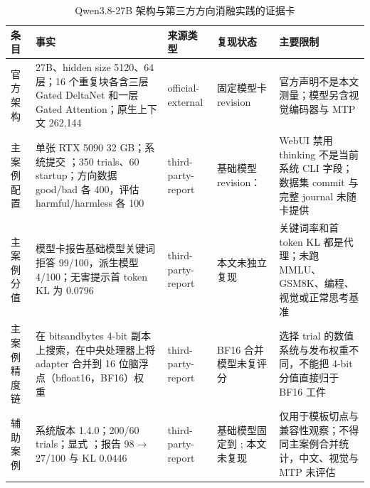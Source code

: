 \begin{table}[t]
  \caption{Qwen3.8-27B 架构与第三方方向消融实践的证据卡}
  \label{tab:qwen-case}
  \centering
  \scriptsize
  \begin{tabularx}{\textwidth}{@{}p{23mm}p{52mm}p{24mm}p{27mm}Y@{}}
    \toprule
    条目 & 事实 & 来源类型 & 复现状态 & 主要限制 \\
    \midrule
    官方架构 & 27B、hidden size 5120、64 层；16 个重复块各含三层 Gated DeltaNet 和一层 Gated Attention；原生上下文 262,144~\cite{qwen38official} & official-external & 固定模型卡 revision & 官方声明不是本文测量；模型另含视觉编码器与 MTP \\
    主案例配置 & 单张 RTX 5090 32 GB；系统提交 ；350 trials、60 startup；方向数据 good/bad 各 400，评估 harmful/harmless 各 100~\cite{qwen38maincase} & third-party-report & 基础模型 revision： & WebUI 禁用 thinking 不是当前系统 CLI 字段；数据集 commit 与完整 journal 未随卡提供 \\
    主案例分值 & 模型卡报告基础模型关键词拒答 99/100，派生模型 4/100；无害提示首 token KL 为 0.0796~\cite{qwen38maincase} & third-party-report & 本文未独立复现 & 关键词率和首 token KL 都是代理；未跑 MMLU、GSM8K、编程、视觉或正常思考基准 \\
    主案例精度链 & 在 bitsandbytes 4-bit 副本上搜索，在中央处理器上将 adapter 合并到 16 位脑浮点（bfloat16，BF16）权重~\cite{qwen38maincase} & third-party-report & BF16 合并模型未复评分 & 选择 trial 的数值系统与发布权重不同，不能把 4-bit 分值直接归于 BF16 工件 \\
    辅助案例 & 系统版本 1.4.0；200/60 trials；显式 ；报告 98$\rightarrow$27/100 与 KL 0.0446~\cite{qwen38auxcase} & third-party-report & 基础模型固定到 ; 本文未复现 & 仅用于模板切点与兼容性观察；不得同主案例合并统计，中文、视觉与 MTP 未评估 \\
    \bottomrule
  \end{tabularx}
\end{table}
